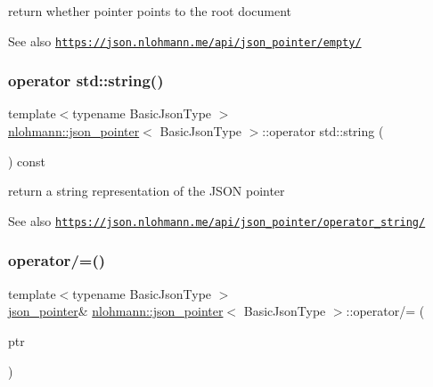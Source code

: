 return whether pointer points to the root document 

\begin{DoxySeeAlso}{See also}
\href{https://json.nlohmann.me/api/json_pointer/empty/}{\tt https\+://json.\+nlohmann.\+me/api/json\+\_\+pointer/empty/} 
\end{DoxySeeAlso}
\mbox{\label{classnlohmann_1_1json__pointer_ae9015c658f99cf3d48a8563accc79988}} 
\subsubsection{\texorpdfstring{operator std\+::string()}{operator std::string()}}
{\footnotesize\ttfamily template$<$typename Basic\+Json\+Type $>$ \\
\hyperlink{classnlohmann_1_1json__pointer}{nlohmann\+::json\+\_\+pointer}$<$ Basic\+Json\+Type $>$\+::operator std\+::string (\begin{DoxyParamCaption}{ }\end{DoxyParamCaption}) const\hspace{0.3cm}{\ttfamily [inline]}}



return a string representation of the J\+S\+ON pointer 

\begin{DoxySeeAlso}{See also}
\href{https://json.nlohmann.me/api/json_pointer/operator_string/}{\tt https\+://json.\+nlohmann.\+me/api/json\+\_\+pointer/operator\+\_\+string/} 
\end{DoxySeeAlso}
\mbox{\label{classnlohmann_1_1json__pointer_a7395bd0af29ac23fd3f21543c935cdfa}} 
\subsubsection{\texorpdfstring{operator/=()}{operator/=()}\hspace{0.1cm}{\footnotesize\ttfamily [1/3]}}
{\footnotesize\ttfamily template$<$typename Basic\+Json\+Type $>$ \\
\hyperlink{classnlohmann_1_1json__pointer}{json\+\_\+pointer}\& \hyperlink{classnlohmann_1_1json__pointer}{nlohmann\+::json\+\_\+pointer}$<$ Basic\+Json\+Type $>$\+::operator/= (\begin{DoxyParamCaption}\item[{const \hyperlink{classnlohmann_1_1json__pointer}{json\+\_\+pointer}$<$ Basic\+Json\+Type $>$ \&}]{ptr }\end{DoxyParamCaption})\hspace{0.3cm}{\ttfamily [inline]}}



